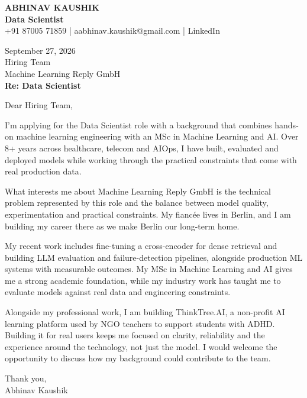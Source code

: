 \documentclass[10pt,a4paper]{article}
\begin{document}
\begin{center}
{\Large\bfseries ABHINAV KAUSHIK}\\[2pt]
{\bfseries Data Scientist}\\[2pt]
+91 87005 71859 \quad | \quad aabhinav.kaushik@gmail.com \quad | \quad LinkedIn
\end{center}
\vspace{8pt}
September 27, 2026\\[6pt]
Hiring Team\\
Machine Learning Reply GmbH\\[4pt]
\textbf{Re: Data Scientist}

Dear Hiring Team,

I’m applying for the Data Scientist role with a background that combines hands-on machine learning engineering with an MSc in Machine Learning and AI. Over 8+ years across healthcare, telecom and AIOps, I have built, evaluated and deployed models while working through the practical constraints that come with real production data.

What interests me about Machine Learning Reply GmbH is the technical problem represented by this role and the balance between model quality, experimentation and practical constraints. My fiancée lives in Berlin, and I am building my career there as we make Berlin our long-term home.

My recent work includes fine-tuning a cross-encoder for dense retrieval and building LLM evaluation and failure-detection pipelines, alongside production ML systems with measurable outcomes. My MSc in Machine Learning and AI gives me a strong academic foundation, while my industry work has taught me to evaluate models against real data and engineering constraints.

Alongside my professional work, I am building ThinkTree.AI, a non-profit AI learning platform used by NGO teachers to support students with ADHD. Building it for real users keeps me focused on clarity, reliability and the experience around the technology, not just the model. I would welcome the opportunity to discuss how my background could contribute to the team.

Thank you,\\
Abhinav Kaushik
\end{document}
